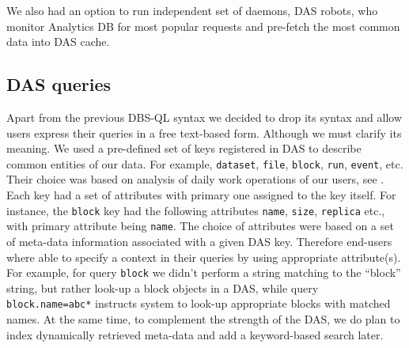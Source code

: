 \documentclass[1p,times]{elsarticle}
\begin{document}
We also had an option to run independent set of daemons, DAS robots, who
monitor Analytics DB for most popular requests and pre-fetch the most
common data into DAS cache. 



\subsection{DAS queries}
Apart from the previous DBS-QL syntax we decided to drop its syntax and allow users
express their queries in a free text-based form. Although we must clarify its
meaning. We used a pre-defined set of keys registered in DAS to describe common
entities of our data. For example, \verb+dataset+, 
\verb+file+, \verb+block+, \verb+run+, \verb+event+, etc. Their choice
was based on analysis of daily work operations of our users, see \cite{DBS07}.
Each key had a set of attributes with primary one assigned to the key itself.
For instance, the \verb+block+ key had the following attributes
\verb+name+, \verb+size+, \verb+replica+ etc., 
with primary attribute being \verb+name+.
The choice of attributes were based on a set of meta-data information
associated with a given DAS key. Therefore end-users where able to specify
a context in their queries by using appropriate attribute(s). For example,
for query \verb+block+ we didn't perform a string matching to the
``block'' string, but rather look-up a block objects in a DAS, while query
\verb+block.name=abc*+ instructs system to look-up appropriate blocks
with matched names. At the same time, to complement the strength of the 
DAS, we do plan to index dynamically retrieved meta-data and add a keyword-based 
search later.
\end{document}
